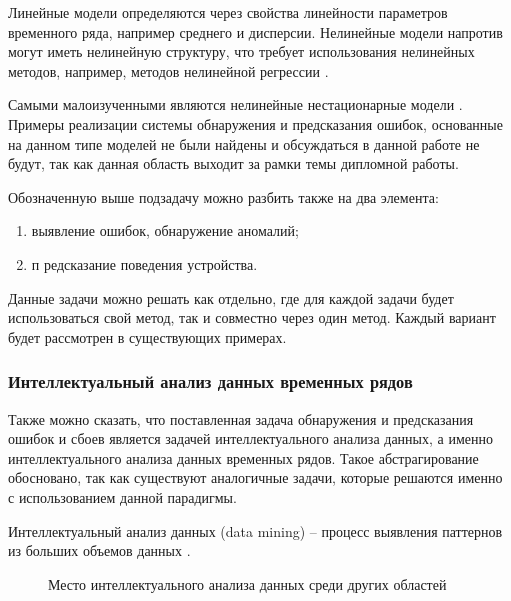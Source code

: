Линейные модели определяются через свойства линейности параметров временного ряда, например среднего и дисперсии.
Нелинейные модели напротив могут иметь нелинейную структуру, что требует использования
нелинейных методов, например, методов нелинейной регрессии \cite{douglas-series} .

Самыми малоизученными являются нелинейные нестационарные модели \cite{rao-series} .
Примеры реализации системы обнаружения и предсказания ошибок,
основанные на данном типе моделей не были найдены и обсуждаться в данной работе не будут,
так как данная область выходит за рамки темы дипломной работы.

Обозначенную выше подзадачу можно разбить также на два элемента:

\begin{enumerate}
    \item выявление ошибок, обнаружение аномалий;
    \item п редсказание поведения устройства.
\end{enumerate}

Данные задачи можно решать как отдельно, где для каждой задачи будет использоваться свой метод,
так и совместно через один метод. Каждый вариант будет рассмотрен в существующих примерах.

\subsubsection{Интеллектуальный анализ данных временных рядов}

Также можно сказать, что поставленная задача обнаружения и предсказания ошибок и сбоев
является задачей интеллектуального анализа данных, а именно
интеллектуального анализа данных временных рядов.
Такое абстрагирование обосновано, так как существуют аналогичные задачи,
которые решаются именно с использованием данной парадигмы.

Интеллектуальный анализ данных (data mining) 
-- процесс выявления паттернов из больших объемов данных \cite{han-mining} .

\begin{figure}[h]
    \caption{Место интеллектуального анализа данных среди других областей}
    \label{mining}
\end{figure}

